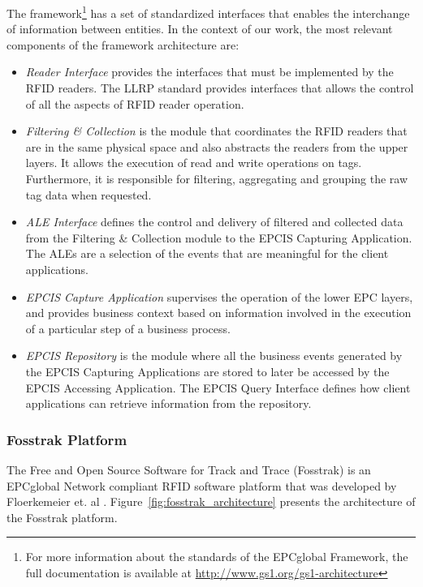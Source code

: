 The framework\footnote{For more information about the standards of the EPCglobal Framework, the
full documentation is available at \url{http://www.gs1.org/gs1-architecture}} has a
set of standardized interfaces that enables the interchange of information between entities. In the
context of our work, the most relevant components of the framework architecture are:

\begin{itemize}
  \item \textit{Reader Interface} provides the interfaces that must be implemented by the \gls{RFID} readers.
  The \gls{LLRP} standard provides interfaces that allows the control of all the aspects of \gls{RFID}
  reader operation.
  \item \textit{Filtering \& Collection} is the module that coordinates the \gls{RFID} readers that are in the
  same physical space and also abstracts the readers from the upper layers. It allows the execution of
  read and write operations on tags. Furthermore, it is responsible for filtering, aggregating and
  grouping the raw tag data when requested.
  \item \textit{\gls{ALE} Interface} defines the control and delivery of filtered and collected data from the
  Filtering \&  Collection module to the \gls{EPCIS} Capturing Application. The \glspl{ALE} are a selection of
  the events that are meaningful for the client applications.
  \item \textit{EPCIS Capture Application} supervises the operation of the lower EPC layers, and provides
  business context based on information involved in the execution of a particular step of a business
  process.
  \item \textit{EPCIS Repository} is the module where all the business events generated by the
  EPCIS Capturing Applications are stored to later be accessed by the EPCIS Accessing Application.
  The EPCIS Query Interface defines how client applications can retrieve information from the repository.
\end{itemize}

\subsubsection{Fosstrak Platform}
\label{subs:fosstrak}
The Free and Open Source Software for Track and Trace (Fosstrak) is an EPCglobal Network compliant
\gls{RFID} software platform that was developed by Floerkemeier et. al \cite{floerkemeier2007rfid}.
Figure~\ref{fig:fosstrak_architecture} presents the architecture of the Fosstrak platform.\\

